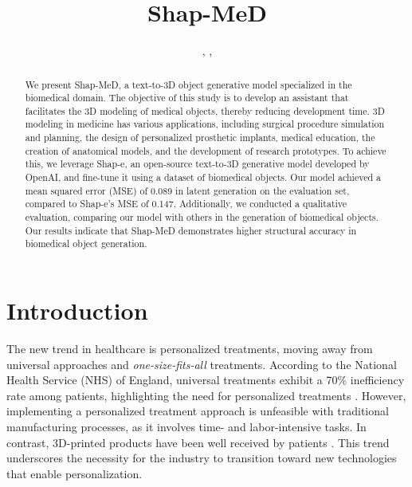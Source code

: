 \documentclass[journal]{IEEEtran}
\begin{document}
\title{Shap-MeD}

\makeatletter
\let\Title\@title
\makeatother

\author{
  , ,   \\
}

\markboth{\Title}
{\Title}

\maketitle

\begin{abstract}
We present Shap-MeD, a text-to-3D object generative model specialized in the biomedical domain. The objective of this study is to develop an assistant that facilitates the 3D modeling of medical objects, thereby reducing development time. 3D modeling in medicine has various applications, including surgical procedure simulation and planning, the design of personalized prosthetic implants, medical education, the creation of anatomical models, and the development of research prototypes. To achieve this, we leverage Shap-e, an open-source text-to-3D generative model developed by OpenAI, and fine-tune it using a dataset of biomedical objects. Our model achieved a mean squared error (MSE) of 0.089 in latent generation on the evaluation set, compared to Shap-e's MSE of 0.147. Additionally, we conducted a qualitative evaluation, comparing our model with others in the generation of biomedical objects. Our results indicate that Shap-MeD demonstrates higher structural accuracy in biomedical object generation.
\end{abstract}

\section{Introduction}
The new trend in healthcare is personalized treatments, moving away from universal approaches and \textit{one-size-fits-all} treatments. According to the National Health Service (NHS) of England, universal treatments exhibit a 70\% inefficiency rate among patients, highlighting the need for personalized treatments \cite{TP}. However, implementing a personalized treatment approach is unfeasible with traditional manufacturing processes, as it involves time- and labor-intensive tasks. In contrast, 3D-printed products have been well received by patients \cite{GOYANES201771}. This trend underscores the necessity for the industry to transition toward new technologies that enable personalization.\\
\end{document}
